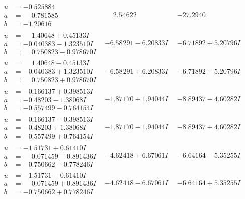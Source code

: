 \documentclass[1p]{elsarticle_modified}
\theoremstyle{definition}
\begin{document}
$$\begin{array}{c|c|c}
\begin{aligned}
u &= -0.525884\phantom{ +0.000000I} \\
a &= \phantom{-}0.781585\phantom{ +0.000000I} \\
b &= -1.20616\phantom{ +0.000000I}\end{aligned}
 & \phantom{-}2.54622\phantom{ +0.000000I} & -27.2940\phantom{ +0.000000I} \\ \hline\begin{aligned}
u &= \phantom{-}1.40648 + 0.45133 I \\
a &= -0.040383 - 1.323510 I \\
b &= \phantom{-}0.750823 - 0.978670 I\end{aligned}
 & -6.58291 - 6.20833 I & -6.71892 + 5.20796 I \\ \hline\begin{aligned}
u &= \phantom{-}1.40648 - 0.45133 I \\
a &= -0.040383 + 1.323510 I \\
b &= \phantom{-}0.750823 + 0.978670 I\end{aligned}
 & -6.58291 + 6.20833 I & -6.71892 - 5.20796 I \\ \hline\begin{aligned}
u &= -0.166137 + 0.398513 I \\
a &= -0.48203 - 1.38068 I \\
b &= -0.557499 - 0.764154 I\end{aligned}
 & -1.87170 + 1.94044 I & -8.89437 - 4.60282 I \\ \hline\begin{aligned}
u &= -0.166137 - 0.398513 I \\
a &= -0.48203 + 1.38068 I \\
b &= -0.557499 + 0.764154 I\end{aligned}
 & -1.87170 - 1.94044 I & -8.89437 + 4.60282 I \\ \hline\begin{aligned}
u &= -1.51731 + 0.61410 I \\
a &= \phantom{-}0.071459 - 0.891436 I \\
b &= -0.750662 - 0.778246 I\end{aligned}
 & -4.62418 + 6.67061 I & -6.64164 - 5.35255 I \\ \hline\begin{aligned}
u &= -1.51731 - 0.61410 I \\
a &= \phantom{-}0.071459 + 0.891436 I \\
b &= -0.750662 + 0.778246 I\end{aligned}
 & -4.62418 - 6.67061 I & -6.64164 + 5.35255 I \\ \hline\begin{aligned}

\end{aligned}
\end{array}$$
\end{document}
